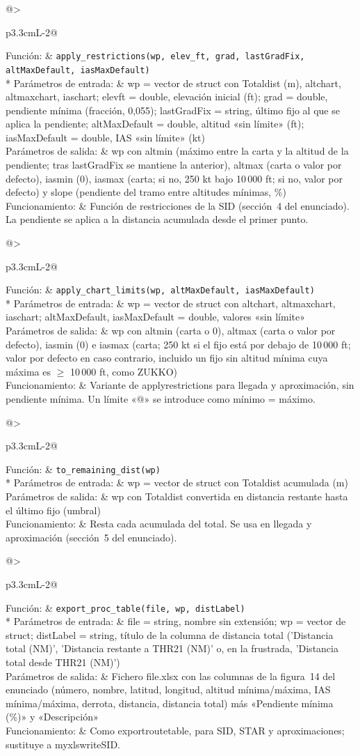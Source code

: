 \documentclass[11pt,a4paper]{article}
\makeatletter
\newcommand{\funcion}[4]{\par\Needspace{8\baselineskip}\begingroup\setlength{\LTleft}{0pt}\setlength{\LTright}{0pt}%
\setlength{\LTpre}{2mm}\setlength{\LTpost}{3mm}%
\begin{longtable}{@{}>{\bfseries\raggedright\arraybackslash}p{3.3cm}L{\dimexpr\linewidth-3.3cm-2\tabcolsep\relax}@{}}\toprule
Función: & \texttt{#1}\\* \midrule
Parámetros de entrada: & #2\\ \midrule
Parámetros de salida: & #3\\ \midrule
Funcionamiento: & #4\\ \bottomrule
\end{longtable}\addtocounter{table}{-1}\endgroup}
\DeclareRobustCommand{\m}[1]{{\ttfamily\def\_{\textunderscore\penalty100\relax}#1}}
\makeatother
\begin{document}
\funcion{apply\_restrictions(wp, elev\_ft, grad, lastGradFix, altMaxDefault, iasMaxDefault)}
{\m{wp} = vector de struct con \m{Total\_dist} (m), \m{alt\_chart}, \m{alt\_max\_chart}, \m{ias\_chart}; \m{elev\_ft} = double, elevación inicial (ft); \m{grad} = double, pendiente mínima (fracción, 0,055); \m{lastGradFix} = string, último fijo al que se aplica la pendiente; \m{altMaxDefault} = double, altitud «sin límite» (ft); \m{iasMaxDefault} = double, IAS «sin límite» (kt)}
{\m{wp} con \m{alt\_min} (máximo entre la carta y la altitud de la pendiente; tras \m{lastGradFix} se mantiene la anterior), \m{alt\_max} (carta o valor por defecto), \m{ias\_min} (0), \m{ias\_max} (carta; si no, 250 kt bajo 10\,000 ft; si no, valor por defecto) y \m{slope} (pendiente del tramo entre altitudes mínimas, \%)}
{Función de restricciones de la SID (sección~4 del enunciado). La pendiente se aplica a la distancia acumulada desde el primer punto.}

\funcion{apply\_chart\_limits(wp, altMaxDefault, iasMaxDefault)}
{\m{wp} = vector de struct con \m{alt\_chart}, \m{alt\_max\_chart}, \m{ias\_chart}; \m{altMaxDefault}, \m{iasMaxDefault} = double, valores «sin límite»}
{\m{wp} con \m{alt\_min} (carta o 0), \m{alt\_max} (carta o valor por defecto), \m{ias\_min} (0) e \m{ias\_max} (carta; 250 kt si el fijo está por debajo de 10\,000 ft; valor por defecto en caso contrario, incluido un fijo sin altitud mínima cuya máxima es $\ge$ 10\,000 ft, como ZUKKO)}
{Variante de \m{apply\_restrictions} para llegada y aproximación, sin pendiente mínima. Un límite «@» se introduce como mínimo = máximo.}

\funcion{to\_remaining\_dist(wp)}
{\m{wp} = vector de struct con \m{Total\_dist} acumulada (m)}
{\m{wp} con \m{Total\_dist} convertida en distancia restante hasta el último fijo (umbral)}
{Resta cada acumulada del total. Se usa en llegada y aproximación (sección~5 del enunciado).}

\funcion{export\_proc\_table(file, wp, distLabel)}
{\m{file} = string, nombre sin extensión; \m{wp} = vector de struct; \m{distLabel} = string, título de la columna de distancia total ('Distancia total (NM)', 'Distancia restante a THR21 (NM)' o, en la frustrada, 'Distancia total desde THR21 (NM)')}
{Fichero \m{file.xlsx} con las columnas de la figura~14 del enunciado (número, nombre, latitud, longitud, altitud mínima/máxima, IAS mínima/máxima, derrota, distancia, distancia total) más «Pendiente mínima (\%)» y «Descripción»}
{Como \m{export\_route\_table}, para SID, STAR y aproximaciones; sustituye a \m{myxlswrite\_SID}.}
\end{document}

